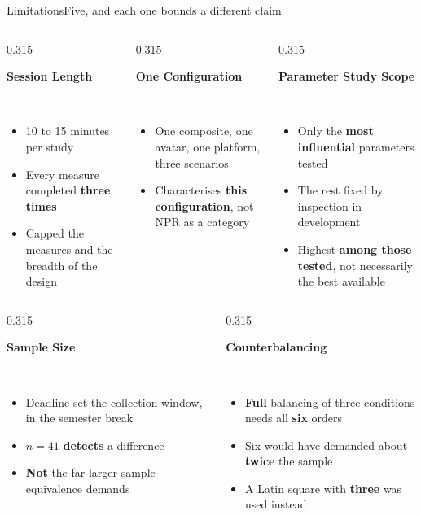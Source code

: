 \documentclass[aspectratio=169,10pt]{beamer}
\newcommand{\hl}[1]{{\color{knblue}\textbf{#1}}}
\newcommand{\good}[1]{{\color{kngreen}\textbf{#1}}}
\newcommand{\bad}[1]{{\color{knred}\textbf{#1}}}
\newcommand{\panelhead}[1]{\noindent\colorbox{kncyan}{\parbox{0.96\textwidth}{\centering\vspace{1pt}\color{white}\scriptsize\bfseries #1\vspace{1pt}}}\\[0.25em]}
\newcommand{\panel}[1]{\noindent\colorbox{knlight}{\parbox{0.96\textwidth}{\vspace{2pt}\scriptsize
\begin{itemize}\setlength{\itemsep}{0.2em}\setlength{\leftmargini}{1.1em}#1\end{itemize}\vspace{2pt}}}}
\begin{document}
\begin{frame}{Limitations}{Five, and each one bounds a different claim}
  \vspace{0.2em}
  \begin{columns}[T]
    \begin{column}{0.315\textwidth}
      \panelhead{Session Length}
      \panel{%
        \item 10 to 15 minutes per study
        \item Every measure completed \hl{three times}
        \item Capped the measures and the breadth of the design}
    \end{column}
    \begin{column}{0.315\textwidth}
      \panelhead{One Configuration}
      \panel{%
        \item One composite, one avatar, one platform, three scenarios
        \item Characterises \hl{this configuration}, not NPR as a category}
    \end{column}
    \begin{column}{0.315\textwidth}
      \panelhead{Parameter Study Scope}
      \panel{%
        \item Only the \hl{most influential} parameters tested
        \item The rest fixed by inspection in development
        \item Highest \bad{among those tested}, not necessarily the best available}
    \end{column}
  \end{columns}
  \vspace{0.35em}

  \begin{columns}[T]
    \begin{column}{0.315\textwidth}
      \panelhead{Sample Size}
      \panel{%
        \item Deadline set the collection window, in the semester break
        \item $n=41$ \good{detects} a difference
        \item \bad{Not} the far larger sample equivalence demands}
    \end{column}
    \begin{column}{0.315\textwidth}
      \panelhead{Counterbalancing}
      \panel{%
        \item \hl{Full} balancing of three conditions needs all \hl{six} orders
        \item Six would have demanded about \hl{twice} the sample
        \item A Latin square with \hl{three} was used instead}
    \end{column}
  \end{columns}
\end{frame}
\end{document}
